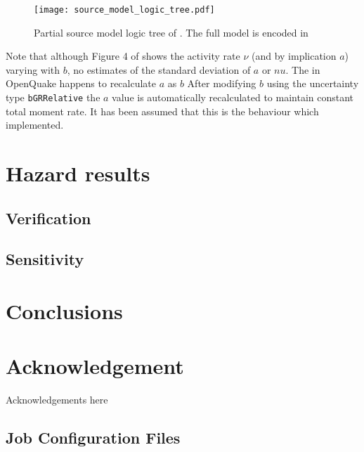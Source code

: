 \documentclass{article}
\begin{document}
\begin{figure}
\begin{adjustbox}{center}
\texttt{[image: source\_model\_logic\_tree.pdf]}
\end{adjustbox}
\caption[Partial source model logic tree]{Partial source model logic tree of \cite{nath2012probabilistic}. The full model is encoded in \texttt{}}
\label{fig:SourceTreePartial}
\end{figure}

Note that although Figure 4 of \cite{nath2012probabilistic} shows the activity rate $\nu$ (and by implication $a$) varying with $b$, no estimates of the standard deviation of $a$ or $nu$. The  in OpenQuake happens to recalculate $a$ as $b$ After modifying $b$ using the uncertainty type \texttt{bGRRelative} the $a$ value is automatically recalculated to maintain constant total moment rate. It has been assumed that this is the behaviour which \cite{nath2012probabilistic} implemented.

\section{Hazard results}
\label{sec:Hazard}

\subsection{Verification}
\label{sec:Verification}

\subsection{Sensitivity}
\label{subsec:Sensitivity}

\section{Conclusions}
\label{sec:Conclusions}

\section*{Acknowledgement}
Acknowledgements here




\begin{appendices}

\section{}
\subsection{Job Configuration Files}
\label{ch:Jobs}



\end{appendices}
\end{document}
